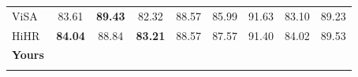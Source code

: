 \documentclass[runningheads]{llncs}
\makeatletter
\let\leaderboards@table\table
\let\leaderboards@endtable\endtable
\renewenvironment{table}[1][]{\leaderboards@table[H]}{\leaderboards@endtable}
\makeatother
\begin{document}
\begin{table}[t]
\begin{tabular}{lcccccccc}
    ViSA~\cite{zhang2026view}          & 83.61                               & \textbf{89.43}         & 82.32                   & 88.57                  & 85.99                   & 91.63                  & 83.10                   & 89.23                  \\
    HiHR~\cite{yang2026hihr}           & \textbf{84.04}                      & 88.84                  & \textbf{83.21}          & 88.57                  & 87.57                   & 91.40                  & 84.02                   & 89.53                  \\
    \Xhline{0.6pt}
    \rowcolor{gray!15}
    \textbf{Yours}                     & \textbf{}                           & \textbf{}              & \textbf{}               & \textbf{}              & \textbf{}               &                        & \textbf{}               & \textbf{}              \\
    \Xhline{1.0pt}
  \end{tabular}
\end{table}
\end{document}
